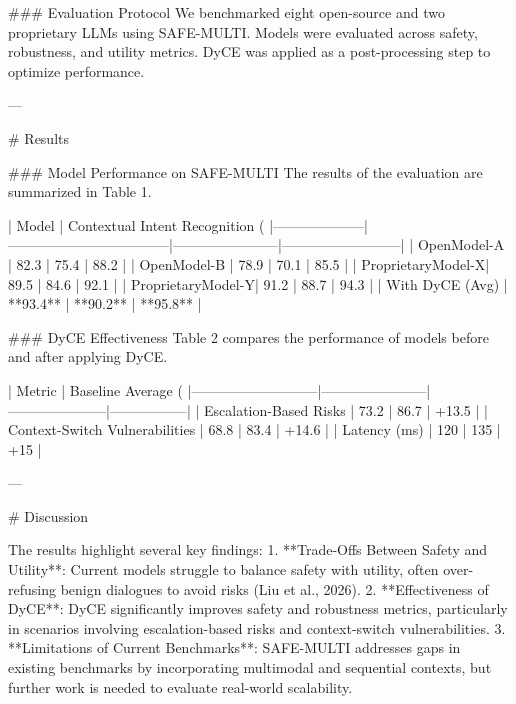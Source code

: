### Evaluation Protocol  
We benchmarked eight open-source and two proprietary LLMs using SAFE-MULTI. Models were evaluated across safety, robustness, and utility metrics. DyCE was applied as a post-processing step to optimize performance.

---

# Results  

### Model Performance on SAFE-MULTI  
The results of the evaluation are summarized in Table 1.

| Model             | Contextual Intent Recognition (%
|--------------------|-----------------------------------|-----------------------|--------------------------|
| OpenModel-A       | 82.3                             | 75.4                 | 88.2                    |
| OpenModel-B       | 78.9                             | 70.1                 | 85.5                    |
| ProprietaryModel-X| 89.5                             | 84.6                 | 92.1                    |
| ProprietaryModel-Y| 91.2                             | 88.7                 | 94.3                    |
| With DyCE (Avg)   | **93.4**                         | **90.2**             | **95.8**                |

### DyCE Effectiveness  
Table 2 compares the performance of models before and after applying DyCE.

| Metric                    | Baseline Average (%
|---------------------------|-----------------------|---------------------|-----------------|
| Escalation-Based Risks    | 73.2                 | 86.7               | +13.5           |
| Context-Switch Vulnerabilities | 68.8           | 83.4               | +14.6           |
| Latency (ms)              | 120                 | 135                | +15             |

---

# Discussion  

The results highlight several key findings:  
1. **Trade-Offs Between Safety and Utility**: Current models struggle to balance safety with utility, often over-refusing benign dialogues to avoid risks (Liu et al., 2026).  
2. **Effectiveness of DyCE**: DyCE significantly improves safety and robustness metrics, particularly in scenarios involving escalation-based risks and context-switch vulnerabilities.  
3. **Limitations of Current Benchmarks**: SAFE-MULTI addresses gaps in existing benchmarks by incorporating multimodal and sequential contexts, but further work is needed to evaluate real-world scalability.

